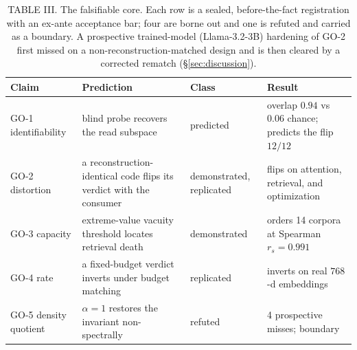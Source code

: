 \documentclass[lettersize,onecolumn]{IEEEtran}
\theoremstyle{definition}
\theoremstyle{remark}
\begin{document}
\begin{table}[!t]
\centering
\footnotesize
\caption{TABLE III. The falsifiable core. Each row is a sealed, before-the-fact registration with
an ex-ante acceptance bar; four are borne out and one is refuted and carried as a
boundary. A prospective trained-model (Llama-3.2-3B) hardening of GO-2 first missed on
a non-reconstruction-matched design and is then cleared by a corrected rematch
(\S\ref{sec:discussion}).}
\label{tab:scoreboard}
\setlength{\tabcolsep}{6pt}\renewcommand{\arraystretch}{1.3}
\begin{tabular}{@{}p{1.3cm}p{4.2cm}p{1.7cm}p{3.6cm}@{}}
\toprule
\textbf{Claim} & \textbf{Prediction} & \textbf{Class} & \textbf{Result} \\
\midrule
GO-1 identifiability & blind probe recovers the read subspace & predicted & overlap $0.94$ vs $0.06$ chance; predicts the flip $12/12$ \\
GO-2 distortion & a reconstruction-identical code flips its verdict with the consumer & demonstrated, replicated & flips on attention, retrieval, and optimization \\
GO-3 capacity & extreme-value vacuity threshold locates retrieval death & demonstrated & orders 14 corpora at Spearman $r_s=0.991$ \\
GO-4 rate & a fixed-budget verdict inverts under budget matching & replicated & inverts on real $768$-d embeddings \\
GO-5 density quotient & $\alpha{=}1$ restores the invariant non-spectrally & refuted & 4 prospective misses; boundary \\
\bottomrule
\end{tabular}
\end{table}
\end{document}
